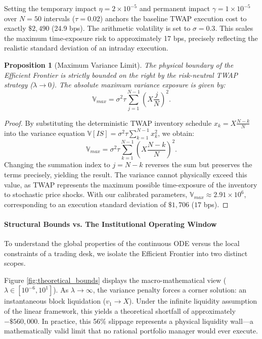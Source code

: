 \documentclass[11pt,a4paper]{article}
\newtheorem{proposition}[theorem]{Proposition}
\begin{document}
Setting the temporary impact $\eta = 2 \times 10^{-5}$ and permanent impact $\gamma = 1 \times 10^{-5}$ over $N=50$ intervals ($\tau=0.02$) anchors the baseline TWAP execution cost to exactly $\$2,490$ (24.9 bps). The arithmetic volatility is set to $\sigma = 0.3$. This scales the maximum time-exposure risk to approximately 17 bps, precisely reflecting the realistic standard deviation of an intraday execution.

\begin{proposition}[Maximum Variance Limit]
The physical boundary of the Efficient Frontier is strictly bounded on the right by the risk-neutral TWAP strategy ($\lambda \to 0$). The absolute maximum variance exposure is given by:
\[ \mathbb{V}_{max} = \sigma^2 \tau \sum_{j=1}^{N-1} \left( X \frac{j}{N} \right)^2. \]
\end{proposition}

\begin{proof}
By substituting the deterministic TWAP inventory schedule $x_k = X \frac{N-k}{N}$ into the variance equation $\mathbb{V}[IS] = \sigma^2 \tau \sum_{k=1}^{N-1} x_k^2$, we obtain:
\[ \mathbb{V}_{max} = \sigma^2 \tau \sum_{k=1}^{N-1} \left( X \frac{N-k}{N} \right)^2. \]
Changing the summation index to $j = N-k$ reverses the sum but preserves the terms precisely, yielding the result. The variance cannot physically exceed this value, as TWAP represents the maximum possible time-exposure of the inventory to stochastic price shocks. With our calibrated parameters, $\mathbb{V}_{max} \approx 2.91 \times 10^6$, corresponding to an execution standard deviation of $\$1,706$ ($17$ bps).
\end{proof}

\paragraph{Structural Bounds vs. The Institutional Operating Window}
To understand the global properties of the continuous ODE versus the local constraints of a trading desk, we isolate the Efficient Frontier into two distinct scopes. 

Figure \ref{fig:theoretical_bounds} displays the macro-mathematical view ($\lambda \in [10^{-6}, 10^1]$). As $\lambda \to \infty$, the variance penalty forces a corner solution: an instantaneous block liquidation ($v_1 \to X$). Under the infinite liquidity assumption of the linear framework, this yields a theoretical shortfall of approximately $-\$560,000$. In practice, this 56\% slippage represents a physical liquidity wall---a mathematically valid limit that no rational portfolio manager would ever execute.
\end{document}
